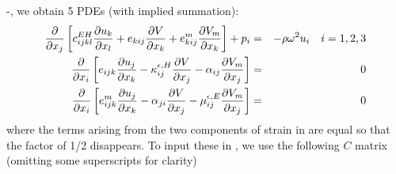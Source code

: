 \documentclass[a4paper,twoside,11pt]{book}
\begin{document}
-, we obtain 5 PDEs (with implied summation):
\begin{eqnarray}
\frac{\partial}{\partial x_j}\left[c_{ijkl}^{EH}\frac{\partial u_{k}}{\partial x_l}
+e_{kij}\frac{\partial V}{\partial x_k}+e^m_{kij}\frac{\partial V_m}{\partial x_k}\right]+p_i
&=&-\rho \omega^2 u_i~~~i=1,2,3 \nonumber\\
\frac{\partial}{\partial x_i}\left[e  _{ijk}\frac{\partial u_j}{\partial x_k}-\kappa^{\epsilon,H}_{ij} \frac{\partial V}{\partial x_j}-\alpha_{ij}\frac{\partial V_m}{\partial x_j}\right]&=&0 \nonumber \\
\frac{\partial}{\partial x_i}\left[e^m_{ijk}\frac{\partial u_j}{\partial x_k}-\alpha_{ji} \frac{\partial V}{\partial x_j}-\mu^{\epsilon,E}_{ij}\frac{\partial V_m}{\partial x_j}\right]&=&0 \label{multipde}
\end{eqnarray}
where the terms arising from the two components of strain in 
are equal so that the factor of 1/2 disappears.  To input these in
\zinc, we use the following $C$ matrix (omitting some superscripts for
clarity)
\end{document}
